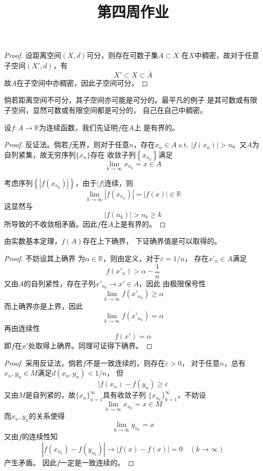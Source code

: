 \documentclass[cn]{homework}
\title{第四周作业}
\begin{document}
    \maketitle

    \problem
    \begin{proof}
        设距离空间$(X,d)$可分，则存在可数子集$A\subset X$
        在$X$中稠密，故对于任意子空间$(X',d)$，有
        \[X'\subset X\subset\bar A\]
        故$A$在子空间中亦稠密，因此子空间可分。
    \end{proof}

    倘若距离空间不可分，其子空间亦可能是可分的。最平凡的例子
    是其可数或有限子空间，显然可数或有限空间都是可分的，
    自己在自己中稠密。

    \problem
    设$f:A\to\mathbb R$为连续函数，我们先证明$f$在$A$上
    是有界的。
    \begin{proof}
        反证法。倘若$f$无界，则对于任意$n$，存在$x_n\in A$ s.t.
        $|f(x_n)|>n$。又$A$为自列紧集，故无穷序列$\{x_n\}$存在
        收敛子列$\left\{x_{n_k}\right\}$满足
        \[\lim_{k\to\infty}x_{n_k}=x\in A\]

        考虑序列$\left\{|f(x_{n_k})|\right\}$，由于$|f|$连续，则
        \[\lim_{k\to\infty}|f(x_{n_k})|=|f(x)|\in\mathbb R\]
        这显然与
        \[|f(n_k)|>n_k\geq k\]
        所导致的不收敛相矛盾。因此$f$在$A$上是有界的。
    \end{proof}

    由实数基本定理，$f(A)$存在上下确界，
    下证确界值是可以取得的。
    \begin{proof}
        不妨设其上确界
        为$\alpha\in\mathbb R$，则由定义，对于$\varepsilon=1/n$，
        存在$x'_n\in A$满足
        \[f(x'_n)>\alpha-\frac{1}{n}\]
        又由$A$的自列紧性，存在子列$x'_{n_k}\to x'\in A$，因此
        由极限保号性
        \[\lim_{k\to\infty}f(x'_{n_k})\geq \alpha\]
        而上确界亦是上界，因此
        \[\lim_{k\to\infty}f(x'_{n_k})=\alpha\]
        再由连续性
        \[f(x')=\alpha\]
        即$f$在$x'$处取得上确界。同理可证得下确界。
    \end{proof}

    \problem
    \begin{proof}
        采用反证法，倘若$f$不是一致连续的，则存在$\varepsilon>0$，
        对于任意$n$，总有$x_n,y_n\in M$满足$d(x_n,y_n)<1/n$，
        但
        \[|f(x_n)-f(y_n)\geq\varepsilon\]
        又由$M$是自列紧的，故$\{x_n\}_{n=1}^\infty$具有收敛子列
        $\{x_{n_k}\}_{k=1}^\infty$，不妨设
        \[\lim_{k\to\infty}x_{n_k}=x\in M\]
        而$x_n,y_n$的关系使得
        \[\lim_{k\to\infty}y_{n_k}=x\]
        又由$f$的连续性知
        \[|f(x_{n_k})-f(y_{n_k})|\to|f(x)-f(x)|=0
        \quad(k\to\infty)\]
        产生矛盾。
        因此$f$一定是一致连续的。
    \end{proof}
\end{document}
